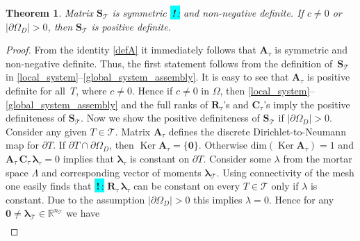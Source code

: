\documentclass[12pt]{article}
\newcommand{\vect}[1]{\boldsymbol{\mathbf{#1}}}
\newcommand{\bcell}{T}
\newcommand{\bmesh}{{\vect{\mathcal T}}}
\newcommand{\mmesh}{{\vect{\mathcal \tau}}}
\newcommand{\toDiscuss}[1]{\colorbox{Cyan}{\textbf{\,!\,}:} #1}
\DeclareMathOperator{\Ker}{Ker}
\newtheorem{theorem}{Theorem}[section]
\begin{document}
\begin{theorem} 
	Matrix $\vect S_\bmesh$ is symmetric \toDiscuss{and non-negative definite}. If $c \ne 0$ or $|\partial\Omega_D|>0 $, then  $\vect S_\bmesh$ is positive definite.
\end{theorem}
\begin{proof}
	From the identity \eqref{defA} it immediately follows that $\vect A_{\mmesh}$ is symmetric and non-negative definite. Thus, the first statement follows from the definition of~$\vect S_\bmesh$ in \eqref{local_system}--\eqref{global_system_assembly}. It is easy to see that $\vect A_{\mmesh}$ is positive definite for all~$\bcell$, where $c \ne 0$. Hence if $c \ne 0$ in $\Omega$, then \eqref{local_system}--\eqref{global_system_assembly} and the full ranks of $\vect R_\mmesh$'s and $\vect C_\mmesh$'s imply the positive definiteness of $\vect S_\bmesh$.
	Now we show the positive definiteness of $\vect S_\bmesh$ if $|\partial\Omega_D|>0 $. Consider  any given $\bcell\in\bmesh$.
	Matrix  $\vect A_{\mmesh}$ defines the discrete Dirichlet-to-Neumann map for $\partial\bcell$.
	If $\partial\bcell\cap\partial\Omega_D$, then $\Ker \vect A_{\mmesh} = \{\vect 0\}$. Otherwise $\mbox{dim}(\Ker \vect A_{\mmesh})=1$ and $\vect A_{\mmesh}\,\vect C_{\mmesh}\,\vect\lambda_\mmesh=0$ implies that $\vect\lambda_\mmesh$ is constant on $\partial\bcell$. Consider some $\lambda$ from the mortar space $\Lambda$ and corresponding vector of moments  $\vect \lambda_\bmesh$. Using connectivity of the mesh one easily finds that \toDiscuss{$\vect R_\mmesh\,\vect\lambda_\mmesh$} can be constant on every $T\in\bmesh$ only if $\lambda$ is constant. Due to the assumption $|\partial\Omega_D|>0$ this implies $\lambda=0$.
	Hence for any $\vect0\neq\vect\lambda_\bmesh\in \mathbb{R}^{n_\bmesh}$ we have
	\begin{align*}

\end{align*}
\end{proof}
\end{document}
